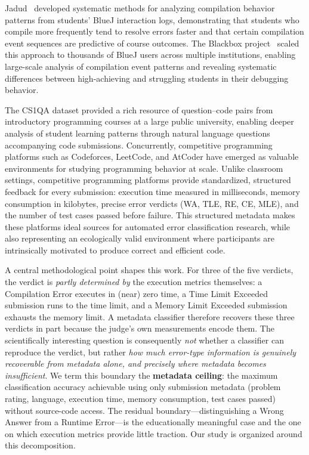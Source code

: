\documentclass[acmsmall]{acmart}
\begin{document}
Jadud~\cite{jadud2006methods} developed systematic methods
for analyzing compilation behavior patterns from students' BlueJ interaction
logs, demonstrating that students who compile more frequently tend to resolve
errors faster and that certain compilation event sequences are predictive of
course outcomes. The Blackbox project~\cite{brown2014blackbox} scaled this
approach to thousands of BlueJ users across multiple institutions, enabling
large-scale analysis of compilation event patterns and revealing systematic
differences between high-achieving and struggling students in their debugging
behavior.

The CS1QA dataset\cite{lee2022cs1qa} provided a rich resource
of question--code pairs from introductory programming courses at a large
public university, enabling deeper analysis of student learning patterns
through natural language questions accompanying code submissions.
Concurrently, competitive programming platforms such as Codeforces, LeetCode,
and AtCoder have emerged as valuable environments for studying programming
behavior at scale. Unlike classroom settings, competitive programming
platforms provide standardized, structured feedback for every submission:
execution time measured in milliseconds, memory consumption in kilobytes,
precise error verdicts (WA, TLE, RE, CE, MLE), and the number of test cases
passed before failure. This structured metadata makes these platforms ideal
sources for automated error classification research, while also representing
an ecologically valid environment where participants are intrinsically
motivated to produce correct and efficient code.

A central methodological point shapes this work. For three of the five
verdicts, the verdict is \emph{partly determined by} the execution metrics
themselves: a Compilation Error executes in (near) zero time, a Time Limit
Exceeded submission runs to the time limit, and a Memory Limit Exceeded
submission exhausts the memory limit. A metadata classifier therefore recovers
these three verdicts in part because the judge's own measurements encode them.
The scientifically interesting question is consequently \emph{not} whether a
classifier can reproduce the verdict, but rather \emph{how much error-type
information is genuinely recoverable from metadata alone, and precisely where
metadata becomes insufficient}. We term this boundary the \textbf{metadata ceiling}:
the maximum classification accuracy achievable using only submission metadata
(problem rating, language, execution time, memory consumption, test cases passed)
without source-code access. The residual boundary---distinguishing a Wrong
Answer from a Runtime Error---is the educationally meaningful case and the one
on which execution metrics provide little traction. Our study is organized
around this decomposition.
\end{document}
